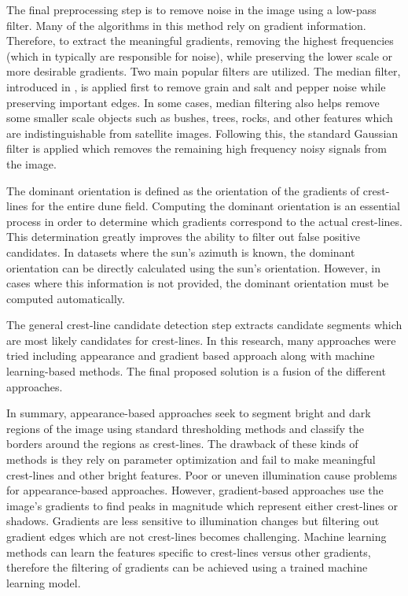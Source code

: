 The final preprocessing step is to remove noise in the image using a low-pass filter. Many of the algorithms in this method rely on gradient information. Therefore, to extract the meaningful gradients, removing the highest frequencies (which in typically are responsible for noise), while preserving the lower scale or more desirable gradients. Two main popular filters are utilized. The median filter, introduced in \cite{huang_median_filtering_algorithm}, is applied first to remove grain and salt and pepper noise while preserving important edges. In some cases, median filtering also helps remove some smaller scale objects such as bushes, trees, rocks, and other features which are indistinguishable from satellite images. Following this, the standard Gaussian filter is applied which removes the remaining high frequency noisy signals from the image.

The dominant orientation is defined as the orientation of the gradients of crest-lines for the entire dune field. Computing the dominant orientation is an essential process in order to determine which gradients correspond to the actual crest-lines. This determination greatly improves the ability to filter out false positive candidates. In datasets where the sun's azimuth is known, the dominant orientation can be directly calculated using the sun's orientation. However, in cases where this information is not provided, the dominant orientation must be computed automatically.

The general crest-line candidate detection step extracts candidate segments which are most likely candidates for crest-lines. In this research, many approaches were tried including appearance and gradient based approach along with machine learning-based methods. The final proposed solution is a fusion of the different approaches.

In summary, appearance-based approaches seek to segment bright and dark regions of the image using standard thresholding methods and classify the borders around the regions as crest-lines. The drawback of these kinds of methods is they rely on parameter optimization and fail to make meaningful crest-lines and other bright features. Poor or uneven illumination cause problems for appearance-based approaches. However, gradient-based approaches use the image's gradients to find peaks in magnitude which represent either crest-lines or shadows. Gradients are less sensitive to illumination changes but filtering out gradient edges which are not crest-lines becomes challenging. Machine learning methods can learn the features specific to crest-lines versus other gradients, therefore the filtering of gradients can be achieved using a trained machine learning model.

